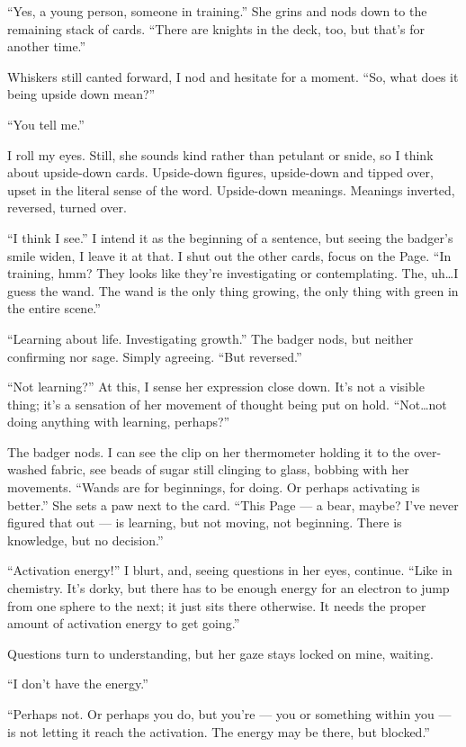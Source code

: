 ``Yes, a young person, someone in training.'' She grins and nods down to the remaining stack of cards. ``There are knights in the deck, too, but that's for another time.''

Whiskers still canted forward, I nod and hesitate for a moment. ``So, what does it being upside down mean?''

``You tell me.''

I roll my eyes. Still, she sounds kind rather than petulant or snide, so I think about upside-down cards. Upside-down figures, upside-down and tipped over, upset in the literal sense of the word. Upside-down meanings. Meanings inverted, reversed, turned over.

``I think I see.'' I intend it as the beginning of a sentence, but seeing the badger's smile widen, I leave it at that. I shut out the other cards, focus on the Page. ``In training, hmm? They looks like they're investigating or contemplating. The, uh\ldots{}I guess the wand. The wand is the only thing growing, the only thing with green in the entire scene.''

``Learning about life. Investigating growth.'' The badger nods, but neither confirming nor sage. Simply agreeing. ``But reversed.''

``Not learning?'' At this, I sense her expression close down. It's not a visible thing; it's a sensation of her movement of thought being put on hold. ``Not\ldots{}not doing anything with learning, perhaps?''

The badger nods. I can see the clip on her thermometer holding it to the over-washed fabric, see beads of sugar still clinging to glass, bobbing with her movements. ``Wands are for beginnings, for doing. Or perhaps activating is better.'' She sets a paw next to the card. ``This Page --- a bear, maybe? I've never figured that out --- is learning, but not moving, not beginning. There is knowledge, but no decision.''

``Activation energy!'' I blurt, and, seeing questions in her eyes, continue. ``Like in chemistry. It's dorky, but there has to be enough energy for an electron to jump from one sphere to the next; it just sits there otherwise. It needs the proper amount of activation energy to get going.''

Questions turn to understanding, but her gaze stays locked on mine, waiting.

``I don't have the energy.''

``Perhaps not. Or perhaps you do, but you're --- you or something within you --- is not letting it reach the activation. The energy may be there, but blocked.''

